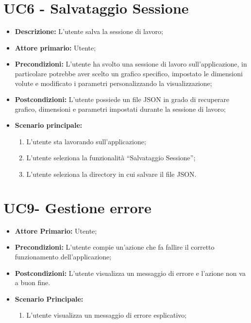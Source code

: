 \section{UC6 - Salvataggio Sessione}

\begin{itemize}
  \item \textbf{Descrizione:} L'utente salva la sessione di lavoro;
  \item \textbf{Attore primario:} Utente;
  \item \textbf{Precondizioni:} L'utente ha svolto una sessione di lavoro sull'applicazione, in particolare potrebbe aver scelto un grafico specifico, impostato le dimensioni volute e modificato i parametri personalizzando la visualizzazione;
  \item \textbf{Postcondizioni:} L'utente possiede un file JSON in grado di recuperare grafico, dimensioni e parametri impostati durante la sessione di lavoro;
  \item \textbf{Scenario principale:}
  \begin{enumerate}
    \item L'utente sta lavorando sull'applicazione;
    \item L'utente seleziona la funzionalità ``Salvataggio Sessione'';
    \item L'utente seleziona la directory in cui salvare il file JSON.
  \end{enumerate}
\end{itemize}

\section{UC9- Gestione errore}
\begin{itemize}
  \item \textbf{Attore Primario:} Utente;
  \item \textbf{Precondizioni:} L'utente compie un'azione che fa fallire il corretto funzionamento dell'applicazione;
  \item \textbf{Postcondizioni:} L'utente visualizza un messaggio di errore e l'azione non va a buon fine.
  \item \textbf{Scenario Principale:}
  \begin{enumerate}
    \item L'utente visualizza un messaggio di errore esplicativo;
  \end{enumerate}
\end{itemize}
